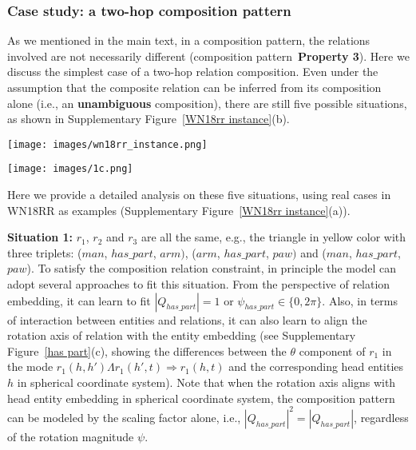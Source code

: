 \documentclass[11pt]{article}
\begin{document}
\subsubsection{Case study: a two-hop composition pattern}

As we mentioned in the main text, in a composition pattern, the relations involved are not necessarily different (composition pattern~\textbf{Property 3}). Here we discuss the simplest case of a two-hop relation composition. Even under the assumption that the composite relation can be inferred from its composition alone (i.e., an \textbf{unambiguous} composition), there are still five possible situations, as shown in Supplementary Figure~\ref{WN18rr instance}(b).  




\begin{figure*}[htbp]
\centering
\begin{minipage}{10cm}
\centering
\texttt{[image: images/wn18rr\_instance.png]}
\subcaption{}
\end{minipage}


\begin{minipage}{8cm}
\centering
\texttt{[image: images/1c.png]}
\subcaption{}
\end{minipage}
\caption{(a) A representative subgraph from WN18RR to show ambiguity. (b) The relations involved in a composition pattern are not necessarily to be mutually different.}
\label{WN18rr instance}
\end{figure*}



Here we provide a detailed analysis on these five situations, using real cases in WN18RR as examples (Supplementary Figure~\ref{WN18rr instance}(a)).

\textbf{Situation 1:} \(r_1\), \(r_2\) and \(r_3\) are all the same, e.g., the triangle in yellow color with three triplets: (\(man\), \(has\_part\), \(arm)\), (\(arm\), \(has\_part\), \(paw)\) and (\(man\), \(has\_part\), \(paw\)). To satisfy the composition relation constraint, in principle the model can adopt several approaches to fit this situation. From the perspective of relation embedding, it can learn to fit \(|Q_{has\_part}|=1\) or \(\psi_{has\_part} \in \{0, 2\pi\}\). Also, in terms of interaction between entities and relations, it can also learn to align the rotation axis of relation with the entity embedding (see Supplementary Figure~\ref{has part}(c), showing the differences between the \(\theta\) component of \(r_1\) in the mode \(r_1(h, h') \Lambda r_1(h', t) \Rightarrow r_1(h, t) \) and the corresponding head entities \(h\) in spherical coordinate system). Note that when the rotation axis aligns with head entity embedding in spherical coordinate system, the composition pattern can be modeled by the scaling factor alone, i.e., \(|Q_{has\_part}|^2 = |Q_{has\_part}|\), regardless of the rotation magnitude \(\psi\). 
\end{document}
